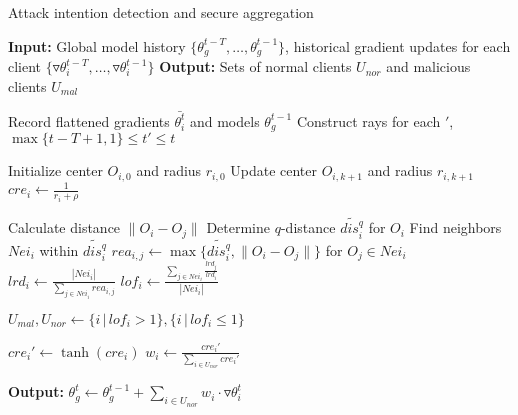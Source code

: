 \documentclass[lettersize,journal]{IEEEtran}
\begin{document}
\begin{algorithm}
\caption{Attack intention detection and secure aggregation}
\label{alg:malicious-node-detection-history}
\begin{algorithmic}[1]
\State \textbf{Input:} Global model history $\{\theta_g^{t-T}, \dots, \theta_g^{t-1}\}$, historical gradient updates for each client $\{\triangledown \theta_{i}^{t-T}, \dots, \triangledown \theta_{i}^{t-1}\}$
\State \textbf{Output:} Sets of normal clients $U_{nor}$ and malicious clients $U_{mal}$


    \State Record flattened gradients $\bar{\theta_i^t}$ and models $\theta_g^{t-1}$
    \State Construct rays for each $'$, $\max\{t-T+1, 1\}\leq t' \leq t$



    \State Initialize center $O_{i,0}$ and radius $r_{i,0}$
        \State Update center $O_{i,k+1}$ and radius $r_{i,k+1}$
    \EndWhile
    \State  $cre_i  \gets \frac{1}{r_i + \rho}$ 



        \State Calculate distance $\|O_i - O_j\|$
    \EndFor
    \State Determine $q$-distance $\widetilde{dis_i^q}$ for $O_i$
    \State Find neighbors $Nei_i$ within $\widetilde{dis_i^q}$
    \State $rea_{i,j}  \gets \max\{\widetilde{dis_i^q}, \|O_i - O_j\|\}$ for $O_j \in Nei_i$  
    \State  $lrd_i  \gets \frac{|Nei_i|}{\sum_{j \in Nei_i} rea_{i,j}}$ 
    \State $lof_i  \gets \frac{\sum_{j \in Nei_i} \frac{lrd_j}{lrd_i}}{|Nei_i|}$

\State $U_{mal}, U_{nor}  \gets \{i \,|\, lof_i > 1\}, \{i \,|\, lof_i \leq 1\}$

        \State $cre_i'  \gets \tanh(cre_i)$
        \State $w_i  \gets \frac{cre_i'}{\sum_{i \in U_{nor}} cre_i'}$
\EndFor

\State \textbf{Output:} $\theta_g^t \gets \theta_g^{t-1} + \sum_{i \in U_{nor}} w_i \cdot \triangledown \theta_i^t$
\end{algorithmic}
\end{algorithm}
\end{document}
